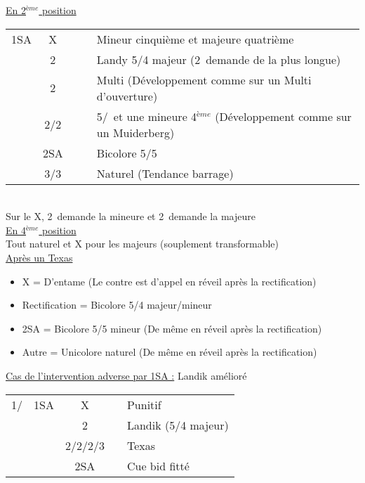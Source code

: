 \documentclass[a4paper, oneside, 11pt]{report}
\begin{document}
	\underline{En 2$^{ème}$ position}
	
	\begin{tabular}{cccc|l}
	1SA & X &&& Mineur cinquième et majeure quatrième\\
	& 2\trefle &&& Landy 5/4 majeur (2\carreau\ demande de la plus longue)\\
	& 2\carreau &&& Multi (Développement comme sur un Multi d'ouverture)\\
	& 2\coeur/2\pique &&& 5\coeur/\pique\ et une mineure 4$^{ème}$ (Développement comme sur un Muiderberg)\\
	& 2SA &&& Bicolore 5\trefle/5\carreau\\
	& 3\trefle/3\carreau &&& Naturel (Tendance barrage)\\
	\end{tabular}\\
	Sur le X, 2\trefle\ demande la mineure et 2\carreau\ demande la majeure\\
	
	\underline{En 4$^{ème}$ position}\\
	Tout naturel et X pour les majeurs (souplement transformable)\\

	\underline{Après un Texas}
	
	\begin{itemize}
	\item X = D'entame (Le contre est d'appel en réveil après la rectification)
	\item Rectification = Bicolore 5/4 majeur/mineur
	\item 2SA = Bicolore 5/5 mineur (De même en réveil après la rectification)
	\item Autre = Unicolore naturel (De même en réveil après la rectification)\\
	\end{itemize}

	\underline{Cas de l'intervention adverse par 1SA :} Landik amélioré\\
	\begin{tabular}{cccc|l}
	1\trefle/\carreau & 1SA & X && Punitif\\
	&& 2\trefle && Landik (5/4 majeur)\\
	&& 2\carreau/2\coeur/2\pique/3\trefle && Texas\\
	&& 2SA && Cue bid fitté\\
	\end{tabular}\\\\
\end{document}
